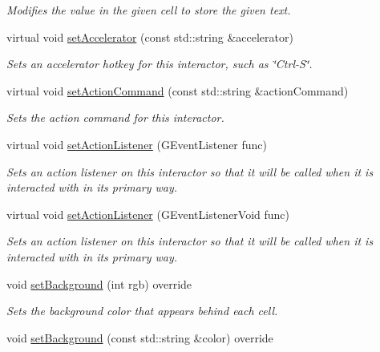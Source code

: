 \begin{DoxyCompactItemize}
\begin{DoxyCompactList}\small\item\em Modifies the value in the given cell to store the given text. \end{DoxyCompactList}\item 
virtual void \mbox{\hyperlink{classGInteractor_ad15f102f62e2960576012f1aa0ba4b2e}{set\+Accelerator}} (const std\+::string \&accelerator)
\begin{DoxyCompactList}\small\item\em Sets an accelerator hotkey for this interactor, such as \char`\"{}\+Ctrl-\/\+S\char`\"{}. \end{DoxyCompactList}\item 
virtual void \mbox{\hyperlink{classGInteractor_a4b5843fe3030e038a1ba54cc03389bcf}{set\+Action\+Command}} (const std\+::string \&action\+Command)
\begin{DoxyCompactList}\small\item\em Sets the action command for this interactor. \end{DoxyCompactList}\item 
virtual void \mbox{\hyperlink{classGInteractor_adcfb4742430c88714fcf57e57ab8ea9c}{set\+Action\+Listener}} (G\+Event\+Listener func)
\begin{DoxyCompactList}\small\item\em Sets an action listener on this interactor so that it will be called when it is interacted with in its primary way. \end{DoxyCompactList}\item 
virtual void \mbox{\hyperlink{classGInteractor_aebd20a89c7a8a43a6fce999cf4f9fcf2}{set\+Action\+Listener}} (G\+Event\+Listener\+Void func)
\begin{DoxyCompactList}\small\item\em Sets an action listener on this interactor so that it will be called when it is interacted with in its primary way. \end{DoxyCompactList}\item 
void \mbox{\hyperlink{classGTable_aefbd30fa3e699d49b6dd2c2a2d6e8c2b}{set\+Background}} (int rgb) override
\begin{DoxyCompactList}\small\item\em Sets the background color that appears behind each cell. \end{DoxyCompactList}\item 
void \mbox{\hyperlink{classGTable_a9cb99695b93494c7ba28268ce9e42c2a}{set\+Background}} (const std\+::string \&color) override

\end{DoxyCompactItemize}
